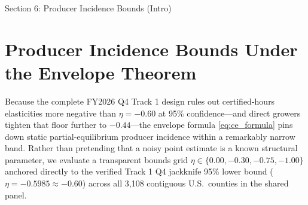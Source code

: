 \FloatBarrier
\begin{llmdraft}{Section 6: Producer Incidence Bounds (Intro)}
\section{Producer Incidence Bounds Under the Envelope Theorem}
\label{sec:welfare}

Because the complete FY2026 Q4 Track 1 design rules out certified-hours
elasticities more negative than $\eta = -0.60$ at 95\% confidence---and direct
growers tighten that floor further to $-0.44$---the envelope formula
\eqref{eq:ce_formula} pins down static partial-equilibrium producer incidence
within a remarkably narrow band. Rather than pretending that a noisy point
estimate is a known structural parameter, we evaluate a transparent bounds grid
$\eta \in \{0.00, -0.30, -0.75, -1.00\}$ anchored directly to the verified
Track 1 Q4 jackknife 95\% lower bound ($\eta = -0.5985 \approx -0.60$) across
all 3,108 contiguous U.S.\ counties in the shared panel.
\end{llmdraft}



